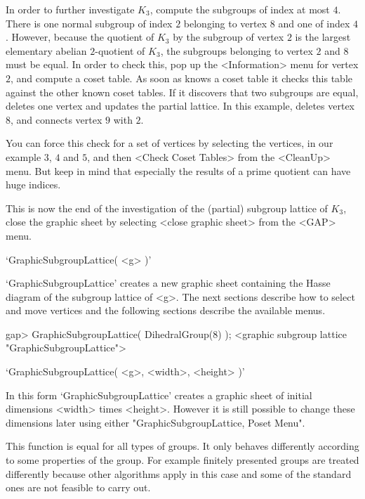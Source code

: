 In order to further investigate $K_3$, compute the  subgroups of index at
most $4$.  There is one normal subgroup of  index $2$ belonging to vertex
$8$ and one of index $4$.  However, because the quotient  of $K_3$ by the
subgroup of vertex $2$ is  the largest elementary abelian $2$-quotient of
$K_3$, the subgroups belonging to vertex  $2$ and $8$ must  be equal.  In
order  to check this,  pop up the  <Information> menu for vertex $2$, and
compute a coset table.  As soon  as {\GAP} knows  a coset table it checks
this table against the other known coset tables. If it discovers that two
subgroups are equal, {\GAP} deletes   one vertex and updates the  partial
lattice.  In this example, {\GAP} deletes vertex $8$, and connects vertex
$9$ with $2$.

You can force this check for a set of vertices by selecting the vertices,
in our example  $3$, $4$ and $5$, and  then <Check Coset Tables> from the
<CleanUp> menu.  But keep in mind that  especially the results of a prime
quotient can have huge indices.

This is  now   the end  of the investigation   of  the (partial) subgroup
lattice of $K_3$,  close the graphic  sheet  by selecting <close  graphic
sheet> from the <GAP> menu.


`GraphicSubgroupLattice( <g> )'

`GraphicSubgroupLattice' creates a new graphic sheet containing the Hasse
diagram of the subgroup lattice of <g>.  The next sections describe
how to select and move vertices and the following sections describe the
available menus.

\begintt
gap> GraphicSubgroupLattice( DihedralGroup(8) );
<graphic subgroup lattice "GraphicSubgroupLattice">
\endtt

`GraphicSubgroupLattice( <g>, <width>, <height> )'

In this form `GraphicSubgroupLattice' creates a graphic sheet of initial
dimensions <width> times <height>.  However it is still possible to change
these dimensions later using either "GraphicSubgroupLattice, Poset Menu".

This function is equal for all types of groups. It only behaves differently
according to some properties of the group. For example finitely presented
groups are treated differently because other algorithms apply in this case
and some of the standard ones are not feasible to carry out. 

